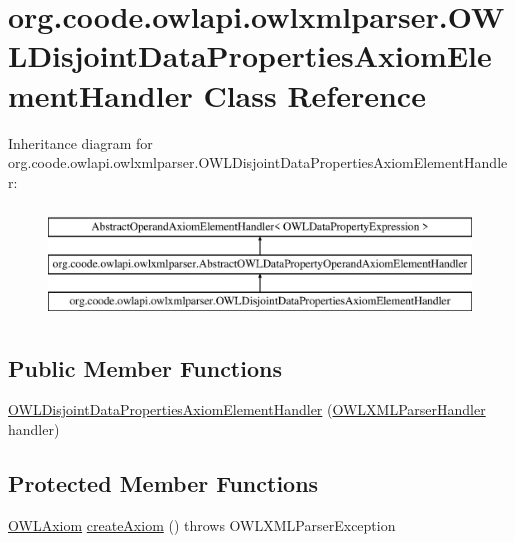 \hypertarget{classorg_1_1coode_1_1owlapi_1_1owlxmlparser_1_1_o_w_l_disjoint_data_properties_axiom_element_handler}{\section{org.\-coode.\-owlapi.\-owlxmlparser.\-O\-W\-L\-Disjoint\-Data\-Properties\-Axiom\-Element\-Handler Class Reference}
\label{classorg_1_1coode_1_1owlapi_1_1owlxmlparser_1_1_o_w_l_disjoint_data_properties_axiom_element_handler}
}
Inheritance diagram for org.\-coode.\-owlapi.\-owlxmlparser.\-O\-W\-L\-Disjoint\-Data\-Properties\-Axiom\-Element\-Handler\-:\begin{figure}[H]
\begin{center}
\leavevmode
\includegraphics[height=3.000000cm]{classorg_1_1coode_1_1owlapi_1_1owlxmlparser_1_1_o_w_l_disjoint_data_properties_axiom_element_handler}
\end{center}
\end{figure}
\subsection*{Public Member Functions}
\begin{DoxyCompactItemize}
\item 
\hyperlink{classorg_1_1coode_1_1owlapi_1_1owlxmlparser_1_1_o_w_l_disjoint_data_properties_axiom_element_handler_a9ae0791757d93270d6da9535df103d50}{O\-W\-L\-Disjoint\-Data\-Properties\-Axiom\-Element\-Handler} (\hyperlink{classorg_1_1coode_1_1owlapi_1_1owlxmlparser_1_1_o_w_l_x_m_l_parser_handler}{O\-W\-L\-X\-M\-L\-Parser\-Handler} handler)
\end{DoxyCompactItemize}
\subsection*{Protected Member Functions}
\begin{DoxyCompactItemize}
\item 
\hyperlink{interfaceorg_1_1semanticweb_1_1owlapi_1_1model_1_1_o_w_l_axiom}{O\-W\-L\-Axiom} \hyperlink{classorg_1_1coode_1_1owlapi_1_1owlxmlparser_1_1_o_w_l_disjoint_data_properties_axiom_element_handler_a583e0b0e39c386d82a3647dccf20b19d}{create\-Axiom} ()  throws O\-W\-L\-X\-M\-L\-Parser\-Exception 
\end{DoxyCompactItemize}


